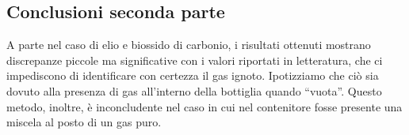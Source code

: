 \subsection{Conclusioni seconda parte}

A parte nel caso di elio e biossido di carbonio, i risultati ottenuti mostrano discrepanze piccole ma significative
con i valori riportati in letteratura, che ci impediscono di identificare con certezza il gas ignoto. Ipotizziamo che ciò sia dovuto alla presenza di gas all'interno
della bottiglia quando ``vuota''.
Questo metodo, inoltre, è inconcludente nel caso in cui nel contenitore fosse presente una miscela al posto di un gas puro.